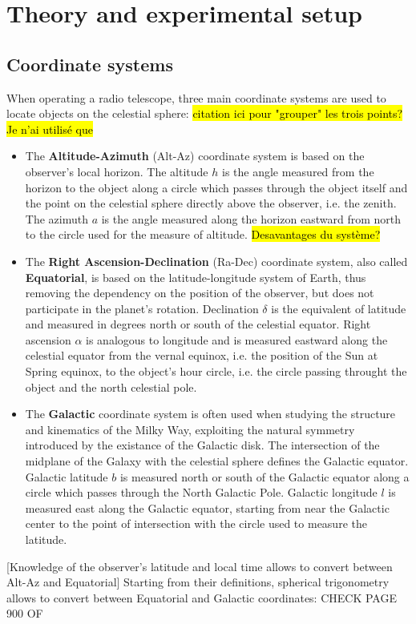 \section{Theory and experimental setup}
\subsection{Coordinate systems}
When operating a radio telescope, three main coordinate systems are used to locate objects on the celestial sphere: \hl{citation ici pour "grouper" les trois points? Je n'ai utilisé que} \cite{carroll_introduction_2007}
\begin{itemize}
    \item The \textbf{Altitude-Azimuth} (Alt-Az) coordinate system is based on the observer's local horizon. The altitude $h$ is the angle measured from the horizon to the object along a circle which passes through the object itself and the point on the celestial sphere directly above the observer, i.e. the zenith. The azimuth $a$ is the angle measured along the horizon eastward from north to the circle used for the measure of altitude. \hl{Desavantages du système?} \cite{carroll_introduction_2007}
    \item The \textbf{Right Ascension-Declination} (Ra-Dec) coordinate system, also called \textbf{Equatorial}, is based on the latitude-longitude system of Earth, thus removing the dependency on the position of the observer, but does not participate in the planet's rotation. Declination $\delta$ is the equivalent of latitude and measured in degrees north or south of the celestial equator. Right ascension $\alpha$ is analogous to longitude and is measured eastward along the celestial equator from the vernal equinox, i.e. the position of the Sun at Spring equinox, to the object's hour circle, i.e. the circle passing throught the object and the north celestial pole.
    \item The \textbf{Galactic} coordinate system is often used when studying the structure and kinematics of the Milky Way, exploiting the natural symmetry introduced by the existance of the Galactic disk. The intersection of the midplane of the Galaxy with the celestial sphere defines the Galactic equator. Galactic latitude $b$ is measured north or south of the Galactic equator along a circle which passes through the North Galactic Pole. Galactic longitude $l$ is measured east along the Galactic equator, starting from near the Galactic center to the point of intersection with the circle used to measure the latitude.
\end{itemize}
[Knowledge of the observer's latitude and local time allows to convert between Alt-Az and Equatorial]
Starting from their definitions, spherical trigonometry allows to convert between Equatorial and Galactic coordinates: CHECK PAGE 900 OF \Cite{carroll_introduction_2007}

